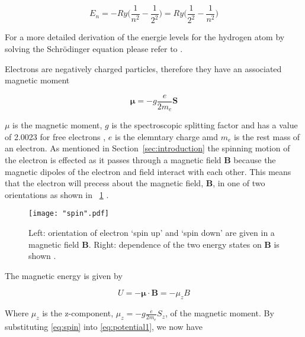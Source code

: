 \documentclass{article}
\newcommand{\figref}[2][\figurename~]{#1\ref{#2}}
\newcommand{\secref}[2][Section~]{#1\ref{#2}}
\begin{document}
\begin{equation}
\label{eq:balmer-series}
E_n = -Ry\Bigg(\frac{1}{n^2} - \frac{1}{2^2}\Bigg) = Ry\Bigg(\frac{1}{2^2} - \frac{1}{n^2}\Bigg)
\end{equation}

\vspace{2mm}
\noindent
For a more detailed derivation of the energie levels for the hydrogen atom by solving the Schr\"{o}dinger equation please refer to \cite{Book02}.

\vspace{2mm}
\noindent
Electrons are negatively charged particles, therefore they have an associated magnetic moment

\begin{equation}
\label{eq:magnetic-moment}
\boldsymbol{\mu} = -g\frac{e}{2m_e}\textbf{S}
\end{equation}

\vspace{2mm}
\noindent
\textbf{$\mu$} is the magnetic moment, $g$ is the spectroscopic splitting factor and has a value of 2.0023 for free electrons \cite{Paper02}, $e$ is the elemntary charge amd $m_e$ is the rest mass of an electron. As mentioned in \secref{sec:introduction} the spinning motion of the electron is effected as it passes through a magnetic field \textbf{B} because the magnetic dipoles of the electron and field interact with each other. This means that the electron will precess about the magnetic field, \textbf{B}, in one of two orientations as shown in \figref{fig:spin} \cite{Paper02}.

\begin{figure}[h]
\centering
\texttt{[image: "spin".pdf]}
\caption{Left: orientation of electron `spin up' and `spin down' are given in a magnetic field \textbf{B}. Right: dependence of the two energy states on \textbf{B} is shown \cite{Paper02}.}
\label{fig:spin}
\end{figure}


\vspace{2mm}
\noindent
The magnetic energy is given by \cite{Paper02}

\begin{equation}
\label{eq:potential1}
U = -\boldsymbol{\mu} \cdot \textbf{B} = - \mu_zB
\end{equation}

\vspace{2mm}
\noindent
Where $\mu_z$ is the z-component, $\mu_z = -g\frac{e}{2m_e}S_z$, of the magnetic moment. By substituting \eqref{eq:spin} into \eqref{eq:potential1}, we now have
\end{document}
